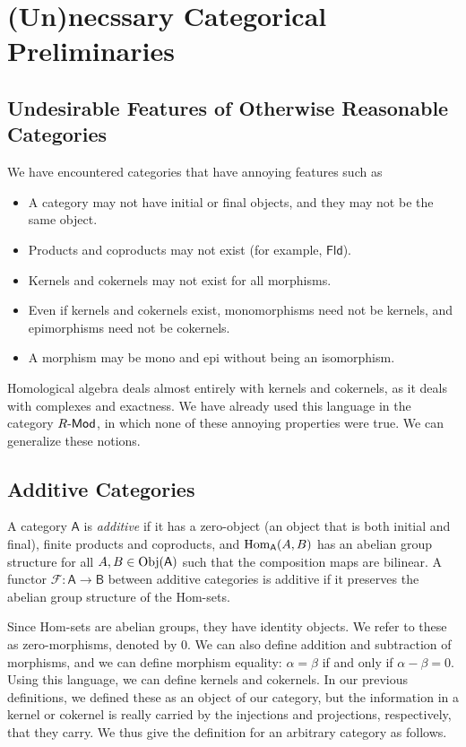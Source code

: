 \section{(Un)necssary Categorical Preliminaries}
\subsection{Undesirable Features of Otherwise Reasonable Categories}
We have encountered categories that have annoying features such as
\begin{itemize}
	\item A category may not have initial or final objects, and they may not be the same object.
	\item Products and coproducts may not exist (for example, $\mathsf{Fld} $).
	\item Kernels and cokernels may not exist for all morphisms.
	\item Even if kernels and cokernels exist, monomorphisms need not be kernels, and epimorphisms need not be cokernels.
	\item A morphism may be mono and epi without being an isomorphism.
\end{itemize}
Homological algebra deals almost entirely with kernels and cokernels, as it deals with complexes and exactness. We have already used this language in the category $R\text{-}\mathsf{Mod} $, in which none of these annoying properties were true. We can generalize these notions.

\subsection{Additive Categories}
\begin{definition}[Additive]\label{dfn:9.1}
	A category $\mathsf{A} $ is \emph{additive} if it has a zero-object (an object that is both initial and final), finite products and coproducts, and $\operatorname{Hom}_{\mathsf{A} }(A, B) $ has an abelian group structure for all $A,B\in \operatorname{Obj}(\mathsf{A} ) $ such that the composition maps are bilinear. A functor $\mathscr{F} : \mathsf{A}  \to \mathsf{B} $ between additive categories is additive if it preserves the abelian group structure of the Hom-sets.
\end{definition}

Since Hom-sets are abelian groups, they have identity objects. We refer to these as zero-morphisms, denoted by $0$. We can also define addition and subtraction of morphisms, and we can define morphism equality: $\alpha =\beta $ if and only if $\alpha -\beta =0$. Using this language, we can define kernels and cokernels. In our previous definitions, we defined these as an object of our category, but the information in a kernel or cokernel is really carried by the injections and projections, respectively, that they carry. We thus give the definition for an arbitrary category as follows.

